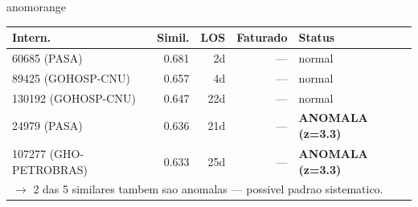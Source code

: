 \documentclass[a4paper,10pt]{article}
\begin{document}
\begin{anomalycard}[Internacao 59 | GHO-POSTAL | ALTO (z=4.69)]{anomorange}
\begin{tabular}{l r r r l}\toprule\textbf{Intern.} & \textbf{Simil.} & \textbf{LOS} & \textbf{Faturado} & \textbf{Status} \\\midrule
60685 (PASA) & 0.681 & 2d & --- & \textcolor{jcubeblue}{normal} \\
89425 (GOHOSP-CNU) & 0.657 & 4d & --- & \textcolor{jcubeblue}{normal} \\
130192 (GOHOSP-CNU) & 0.647 & 22d & --- & \textcolor{jcubeblue}{normal} \\
24979 (PASA) & 0.636 & 21d & --- & \textcolor{anomred}{\textbf{ANOMALA (z=3.3)}} \\
107277 (GHO-PETROBRAS) & 0.633 & 25d & --- & \textcolor{anomred}{\textbf{ANOMALA (z=3.3)}} \\
\multicolumn{5}{l}{\textcolor{anomred}{\small $\rightarrow$ 2 das 5 similares tambem sao anomalas --- possivel padrao sistematico.}} \\
\bottomrule\end{tabular}


\end{anomalycard}

\newpage
\end{document}
